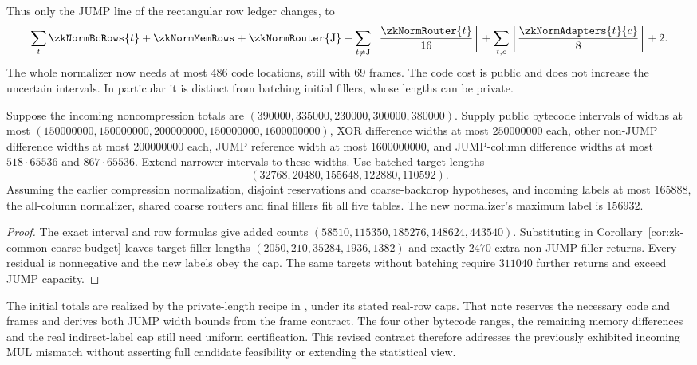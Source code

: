 Thus only the JUMP line of the rectangular row ledger changes, to
\[
 \sum_t\zkNormBcRows{t}+\zkNormMemRows+\zkNormRouter{\mathrm J}
 +\sum_{t\ne\mathrm J}\left\lceil\frac{\zkNormRouter{t}}{16}\right\rceil
 +\sum_{t,c}\left\lceil\frac{\zkNormAdapters{t}{c}}8\right\rceil+2.
\]
The whole normalizer now needs at most $486$ code locations, still with $69$ frames. The code cost is public and does not increase the uncertain intervals. In particular it is distinct from batching initial fillers, whose lengths can be private.

\begin{proposition}\label{prop:zk-revised-count-budget}
Suppose the incoming noncompression totals are $(390000,335000,230000,300000,380000)$. Supply public bytecode intervals of widths at most $(150000000,150000000,200000000,150000000,1600000000)$, XOR difference widths at most $250000000$ each, other non-JUMP difference widths at most $200000000$ each, JUMP reference width at most $1600000000$, and JUMP-column difference widths at most $518\cdot65536$ and $867\cdot65536$. Extend narrower intervals to these widths. Use batched target lengths
\[
 (32768,20480,155648,122880,110592).
\]
Assuming the earlier compression normalization, disjoint reservations and coarse-backdrop hypotheses, and incoming labels at most $165888$, the all-column normalizer, shared coarse routers and final fillers fit all five tables. The new normalizer's maximum label is $156932$.
\end{proposition}
\begin{proof}
The exact interval and row formulas give added counts $(58510,115350,185276,148624,443540)$. Substituting in Corollary~\ref{cor:zk-common-coarse-budget} leaves target-filler lengths $(2050,210,35284,1936,1382)$ and exactly $2470$ extra non-JUMP filler returns. Every residual is nonnegative and the new labels obey the cap. The same targets without batching require $311040$ further returns and exceed JUMP capacity.
\end{proof}

The initial totals are realized by the private-length recipe in , under its stated real-row caps. That note reserves the necessary code and frames and derives both JUMP width bounds from the frame contract. The four other bytecode ranges, the remaining memory differences and the real indirect-label cap still need uniform certification. This revised contract therefore addresses the previously exhibited incoming MUL mismatch without asserting full candidate feasibility or extending the statistical view.

